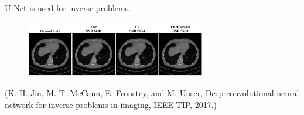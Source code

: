 \begin{frame}[allowframebreaks]
\begin{myconceptblock}{8.29}{U-Net is used for inverse problems.}
    \begin{figure}[H]
        \centering
        \includegraphics[width=0.7\textwidth]{.././assets/8.29.png}
    \end{figure}

    (K. H. Jin, M. T. McCann, E. Froustey, and M. Unser, Deep convolutional neural network for inverse problems in imaging, IEEE TIP, 2017.)
\end{myconceptblock}

\end{frame}

